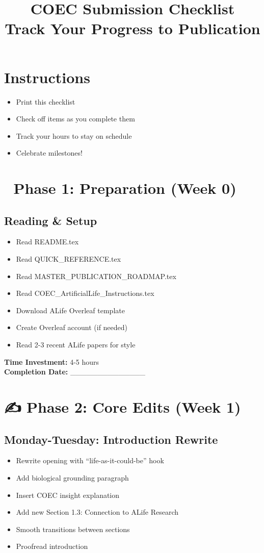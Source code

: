 \documentclass[11pt]{article}
\title{\textbf{COEC Submission Checklist}\\
\large Track Your Progress to Publication}
\date{}
\begin{document}
\maketitle

\section*{Instructions}
\begin{itemize}
    \item Print this checklist
    \item Check off items as you complete them
    \item Track your hours to stay on schedule
    \item Celebrate milestones!
\end{itemize}

\section*{📖 Phase 1: Preparation (Week 0)}

\subsection*{Reading \& Setup}
\begin{itemize}[label=$\square$]
    \item Read README.tex
    \item Read QUICK\_REFERENCE.tex
    \item Read MASTER\_PUBLICATION\_ROADMAP.tex
    \item Read COEC\_ArtificialLife\_Instructions.tex
    \item Download ALife Overleaf template
    \item Create Overleaf account (if needed)
    \item Read 2-3 recent ALife papers for style
\end{itemize}

\textbf{Time Investment:} 4-5 hours\\
\textbf{Completion Date:} \_\_\_\_\_\_\_\_\_\_\_\_\_\_

\section*{✍️ Phase 2: Core Edits (Week 1)}

\subsection*{Monday-Tuesday: Introduction Rewrite}
\begin{itemize}[label=$\square$]
    \item Rewrite opening with ``life-as-it-could-be'' hook
    \item Add biological grounding paragraph
    \item Insert COEC insight explanation
    \item Add new Section 1.3: Connection to ALife Research
    \item Smooth transitions between sections
    \item Proofread introduction
\end{itemize}
\end{document}
